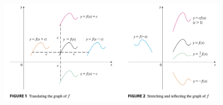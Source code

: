 \documentclass[t]{beamer}
\theoremstyle{plain}
\theoremstyle{definition}
\newcounter{heading}
\newcommand{\newhead}[1]{\medskip\stepcounter{heading}\noindent\textbf{\hspace{0.2cm}{#1}.}}
\begin{document}
\begin{frame}
\begin{figure}[htbp]
\centerline{\includegraphics[scale=.3]{fig/transformations}}
\label{fig}
\end{figure}
\end{frame}

\end{document}
